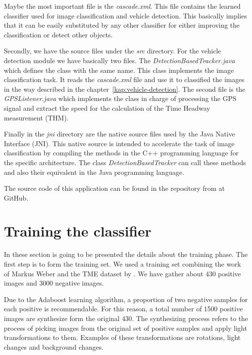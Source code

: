 Maybe the most important file is the \textit{cascade.xml}. This file contains
the learned classifier used for image classification and vehicle detection. This
basically implies that it can be easily substituted by any other classifier for
either improving the classification or detect other objects.

Secondly, we have the source files under the \textit{src} directory. For the
vehicle detection module we have basically two files. The
\textit{DetectionBasedTracker.java} which defines the class with the same name.
This class implements the image classification task. It reads the
\textit{cascade.xml} file and use it to classified the images in the way
described in the chapter~\ref{kap:vehicle-detection}. The second file is the
\textit{GPSListener.java} which implements the class in charge of processing the
GPS signal and extract the speed for the calculation of the Time Headway
measurement (THM). 

Finally in the \textit{jni} directory are the native source files used by the
Java Native Interface (JNI). This native source is intended to accelerate the
task of image classification by compiling the methods in the C++ programming
language for the specific architecture. The class \textit{DetectionBasedTracker} 
can call these methods and also their equivalent in the Java programming
language.

The source code of this application can be found in the repository from
\cite{andrive} at GitHub.


\section{Training the classifier} %
\label{sec:trainingClasssifier}

In these section is going to be presented the details about the training phase.
The first step is to form the training set. We used a training set combining the
work of Markus Weber and the TME dataset by \cite{tme}. We have gather about 430
positive images and 3000 negative images.

Due to the Adaboost learning algorithm, a proportion of two negative samples for
each positive is recommendable. For this reason, a total number of 1500 positive
images are synthesize form the original 430. The synthesizing process refers to
the process of picking images from the original set of positive samples and
apply light transformations to them. Examples of these transformations are
rotations, light changes and background changes.

